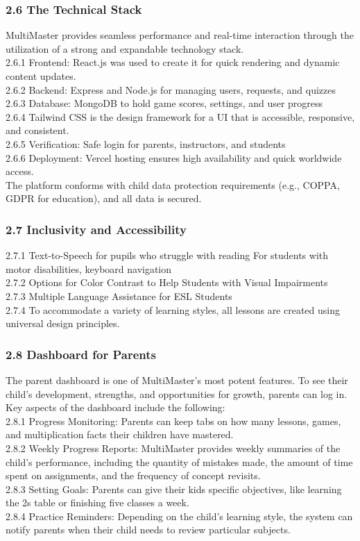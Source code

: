 \documentclass[BTech]{audiss}
\begin{document}
\subsubsection{2.6 The Technical Stack}
MultiMaster provides seamless performance and real-time interaction through the utilization of a strong and expandable technology stack.\\
2.6.1 Frontend: React.js was used to create it for quick rendering and dynamic content updates.\\
2.6.2 Backend: Express and Node.js for managing users, requests, and quizzes \\
2.6.3 Database: MongoDB to hold game scores, settings, and user progress\\ 2.6.4 Tailwind CSS is the design framework for a UI that is accessible, responsive, and consistent.\\
2.6.5 Verification: Safe login for parents, instructors, and students\\
2.6.6 Deployment: Vercel hosting ensures high availability and quick worldwide access.\\
The platform conforms with child data protection requirements (e.g., COPPA, GDPR for education), and all data is secured.\\
\subsubsection{2.7 Inclusivity and Accessibility}
2.7.1 Text-to-Speech for pupils who struggle with reading For students with motor disabilities, keyboard navigation\\
2.7.2 Options for Color Contrast to Help Students with Visual Impairments\\ 2.7.3 Multiple Language Assistance for ESL Students\\
2.7.4 To accommodate a variety of learning styles, all lessons are created using universal design principles.\\

\subsubsection{2.8 Dashboard for Parents}
The parent dashboard is one of MultiMaster's most potent features. To see their child's development, strengths, and opportunities for growth, parents can log in. Key aspects of the dashboard include the following:\\
2.8.1 Progress Monitoring: Parents can keep tabs on how many lessons, games, and multiplication facts their children have mastered.\\
2.8.2 Weekly Progress Reports: MultiMaster provides weekly summaries of the child's performance, including the quantity of mistakes made, the amount of time spent on assignments, and the frequency of concept revisits.\\
2.8.3 Setting Goals: Parents can give their kids specific objectives, like learning the 2s table or finishing five classes a week.\\
2.8.4 Practice Reminders: Depending on the child's learning style, the system can notify parents when their child needs to review particular subjects.\\
\end{document}
